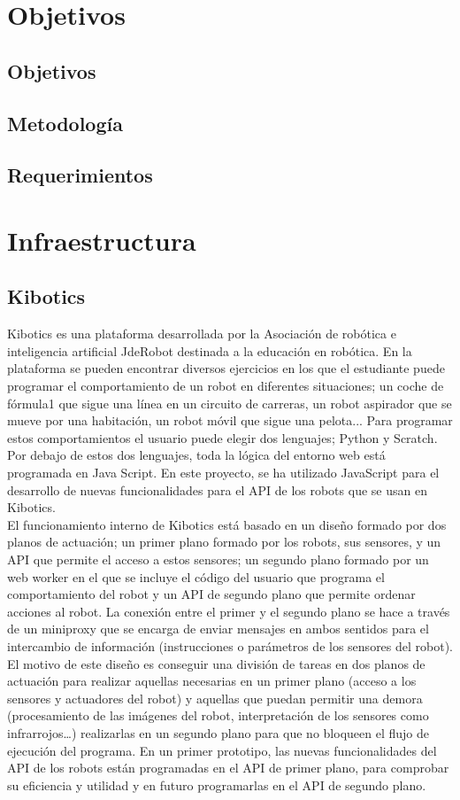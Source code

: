 \documentclass{report}
\begin{document}
\chapter{Objetivos}

\section{Objetivos}
\section{Metodología}
\section{Requerimientos}

\chapter{Infraestructura}
\section{Kibotics}
Kibotics es una plataforma desarrollada por la Asociación de robótica e inteligencia artificial JdeRobot destinada a la educación en robótica. En la plataforma se pueden encontrar diversos ejercicios en los que el estudiante puede programar el comportamiento de un robot en diferentes situaciones; un coche de fórmula1 que sigue una línea en un circuito de carreras, un robot aspirador que se mueve por una habitación, un robot móvil que sigue una pelota... Para programar estos comportamientos el usuario puede elegir dos lenguajes; Python y Scratch. Por debajo de estos dos lenguajes, toda la lógica del entorno web está programada en Java Script. En este proyecto, se ha utilizado JavaScript para el desarrollo de nuevas funcionalidades para el API de los robots que se usan en Kibotics. 
\\

El funcionamiento interno de Kibotics está basado en un diseño formado por dos planos de actuación; un primer plano formado por los robots, sus sensores, y un API que permite el acceso a estos sensores; un segundo plano formado por un web worker en el que se incluye el código del usuario que programa el comportamiento del robot y un API de segundo plano que permite ordenar acciones al robot. La conexión entre el primer y el segundo plano se hace a través de un miniproxy que se encarga de enviar mensajes en ambos sentidos para el intercambio de información (instrucciones o parámetros de los sensores del robot). El motivo de este diseño es conseguir una división de tareas en dos planos de actuación para realizar aquellas necesarias en un primer plano (acceso a los sensores y actuadores del robot) y aquellas que puedan permitir una demora (procesamiento de las imágenes del robot, interpretación de los sensores como infrarrojos…) realizarlas en un segundo plano para que no bloqueen el flujo de ejecución del programa. En un primer prototipo, las nuevas funcionalidades del API de los robots están programadas en el API de primer plano, para comprobar su eficiencia y utilidad y en futuro programarlas en el API de segundo plano.
\end{document}
